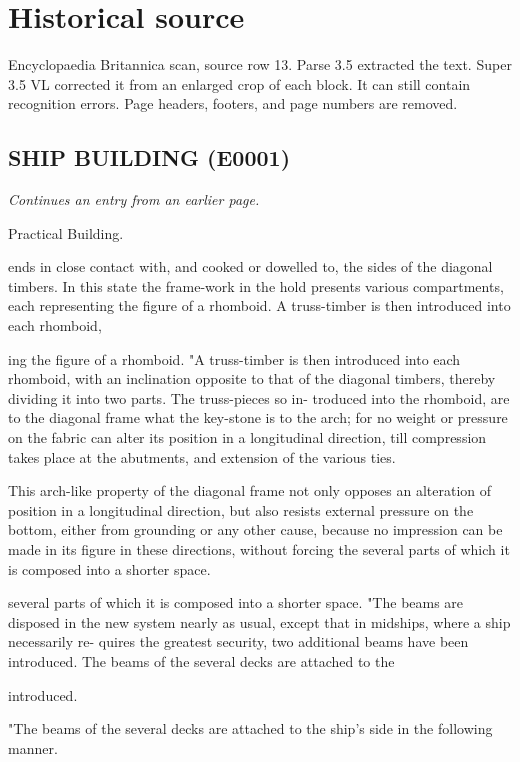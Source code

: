 \documentclass{article}
\begin{document}
\section*{Historical source}
Encyclopaedia Britannica scan, source row 13. Parse 3.5 extracted the text. Super 3.5 VL corrected it from an enlarged crop of each block. It can still contain recognition errors.
Page headers, footers, and page numbers are removed.

\subsection*{SHIP BUILDING (E0001)}
\textit{Continues an entry from an earlier page.}

Practical
Building.

ends in close contact with, and cooked or dowelled to, the sides of the diagonal timbers. In this state the frame-work in the hold presents various compartments, each representing the figure of a rhomboid. A truss-timber is then introduced into each rhomboid,

ing the figure of a rhomboid.
"A truss-timber is then introduced into each rhomboid,
with an inclination opposite to that of the diagonal timbers,
thereby dividing it into two parts. The truss-pieces so in-
troduced into the rhomboid, are to the diagonal frame what
the key-stone is to the arch; for no weight or pressure on
the fabric can alter its position in a longitudinal direction,
till compression takes place at the abutments, and extension
of the various ties.

This arch-like property of the diagonal frame not only opposes an alteration of position in a longitudinal direction, but also resists external pressure on the bottom, either from grounding or any other cause, because no impression can be made in its figure in these directions, without forcing the several parts of which it is composed into a shorter space.

several parts of which it is composed into a shorter space.
"The beams are disposed in the new system nearly as
usual, except that in midships, where a ship necessarily re-
quires the greatest security, two additional beams have been
introduced.
The beams of the several decks are attached to the

introduced.

"The beams of the several decks are attached to the
ship's side in the following manner.
\end{document}
